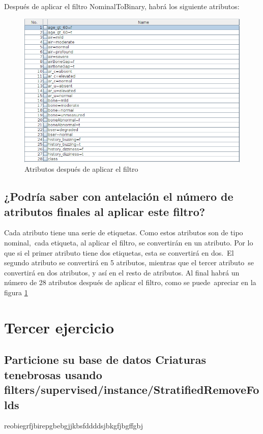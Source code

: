 \documentclass[11pt,twoside,a4paper]{book}
\begin{document}
Después de aplicar el filtro NominalToBinary, habrá los siguiente atributos:

\begin{figure}[H]
	\includegraphics[width=\textwidth]{ejercicio2_1.png}
	\caption{Atributos después de aplicar el filtro}
	\label{Fig5}
\end{figure}

\section{¿Podría saber con antelación el número de atributos finales al aplicar este filtro?}
Cada atributo tiene una serie de etiquetas. Como estos atributos son de tipo nominal,\
cada etiqueta, al aplicar el filtro, se convertirán en un atributo.
Por lo que si el primer atributo tiene dos etiquetas, esta se convertirá en dos.\
El segundo atributo se convertirá en 5 atributos, mientras que el tercer atributo\
se convertirá en dos atributos, y así en el resto de atributos.
Al final habrá un número de 28 atributos después de aplicar el filtro, como se puede\
apreciar en la figura \ref{Fig5}


\chapter{Tercer ejercicio}
\section{Particione su base de datos Criaturas tenebrosas \break usando filters/supervised/instance/StratifiedRemoveFolds}

reobiegrfjbirepgbebgjjkbsfddddsjbkgfjbgffgbj
\end{document}
